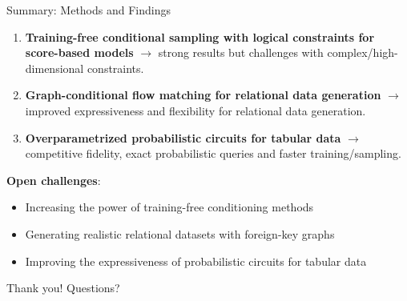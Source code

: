 \begin{frame}[fragile]{Summary: Methods and Findings}
  \begin{enumerate}
    \item \textbf{Training-free conditional sampling with logical constraints for score-based models} $\rightarrow$ strong results but challenges with complex/high-dimensional constraints.
    \item \textbf{Graph-conditional flow matching for relational data generation} $\rightarrow$ improved expressiveness and flexibility for relational data generation.
    \item \textbf{Overparametrized probabilistic circuits for tabular data} $\rightarrow$ competitive fidelity, exact probabilistic queries and faster training/sampling.
  \end{enumerate}


  \textbf{Open challenges}:
  \begin{itemize}
    \item Increasing the power of training-free conditioning methods
    \item Generating realistic relational datasets with foreign-key graphs
    \item Improving the expressiveness of probabilistic circuits for tabular data
  \end{itemize}
\end{frame}


\begin{frame}[standout]
  \vspace{10mm}
  Thank you! Questions?
\end{frame}
